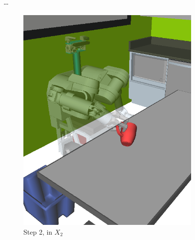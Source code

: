 \documentclass{report}
\newlength{\offsetpage}
\newenvironment{widepage}
   {\begin{adjustwidth}{-\offsetpage}{-\offsetpage}%
    \addtolength{\textwidth}{2\offsetpage}}%
{\end{adjustwidth}}
\begin{document}
\begin{figure}
\begin{widepage}
\begin{subfigure}[t]{0.185\linewidth}
\includegraphics[width=\columnwidth]{figs/testherb-c.png}
\caption{Step 2, in $X_2$}
\end{subfigure}
\begin{subfigure}[t]{0.185\linewidth}
\centering

\end{subfigure}
\end{widepage}
\end{figure}
\end{document}
